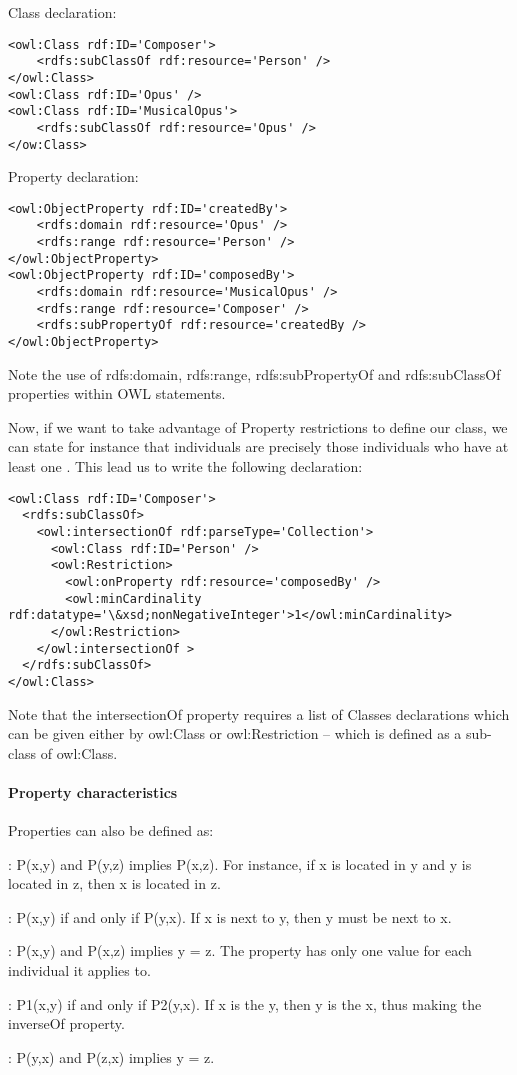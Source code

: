 Class declaration:
\begin{Verbatim}[fontsize=\small,formatcom=\color{black!70}]
<owl:Class rdf:ID='Composer'>
	<rdfs:subClassOf rdf:resource='Person' />
</owl:Class>
<owl:Class rdf:ID='Opus' />
<owl:Class rdf:ID='MusicalOpus'>
	<rdfs:subClassOf rdf:resource='Opus' />
</ow:Class>
\end{Verbatim}

Property declaration:
\begin{Verbatim}[fontsize=\small,formatcom=\color{black!70}]
<owl:ObjectProperty rdf:ID='createdBy'>
	<rdfs:domain rdf:resource='Opus' />
	<rdfs:range rdf:resource='Person' />
</owl:ObjectProperty>
<owl:ObjectProperty rdf:ID='composedBy'>
	<rdfs:domain rdf:resource='MusicalOpus' />
	<rdfs:range rdf:resource='Composer' />
	<rdfs:subPropertyOf rdf:resource='createdBy />
</owl:ObjectProperty>
\end{Verbatim}
Note the use of rdfs:domain, rdfs:range, rdfs:subPropertyOf and rdfs:subClassOf properties within OWL statements.

Now, if we want to take advantage of Property restrictions to define our  class, we can state for instance that  individuals are precisely those  individuals who have  at least one . 
This lead us to write the following declaration: 
\begin{Verbatim}[fontsize=\small,formatcom=\color{black!70}]
<owl:Class rdf:ID='Composer'>
  <rdfs:subClassOf>
    <owl:intersectionOf rdf:parseType='Collection'>
      <owl:Class rdf:ID='Person' />
      <owl:Restriction>
        <owl:onProperty rdf:resource='composedBy' />
        <owl:minCardinality rdf:datatype='\&xsd;nonNegativeInteger'>1</owl:minCardinality>
      </owl:Restriction>
    </owl:intersectionOf >
  </rdfs:subClassOf>	
</owl:Class>
\end{Verbatim}
Note that the intersectionOf property requires a list of Classes declarations which can be given either by owl:Class or owl:Restriction – which is defined as a sub-class of owl:Class. 

\paragraph{Property characteristics}
Properties can also be defined as:
\begin{liste}
	\item {}: P(x,y) and P(y,z) implies P(x,z). For instance, if x is located in y and y is located in z, then x is located in z. 
	\item {}: P(x,y) if and only if P(y,x). If x is next to y, then y must be next to x. 
	\item {}: P(x,y) and P(x,z) implies y = z. The property has only one value for each individual it applies to. 
	\item {}: P1(x,y) if and only if P2(y,x). If x is the  y, then y is the  x, thus making  the inverseOf  property. 
	\item {}: P(y,x) and P(z,x) implies y = z.
\end{liste}


